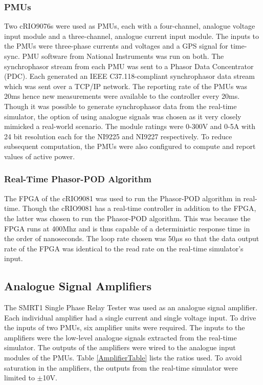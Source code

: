\documentclass[conference]{IEEEtran}
\begin{document}
\subsubsection*{PMUs} Two cRIO9076s were used as PMUs, each with a four-channel, analogue voltage input module and a three-channel, analogue current input module. The inputs to the PMUs were three-phase currents and voltages and a GPS signal for time-sync. PMU software from National Instruments was run on both. The synchrophasor stream from each PMU was sent to a Phasor Data Concentrator (PDC)\cite{SEL}. Each generated an IEEE C37.118-compliant synchrophasor data stream which was sent over a TCP/IP network. The reporting rate of the PMUs was 20ms hence new measurements were available to the controller every 20ms. Though it was possible to generate synchrophasor data from the real-time simulator, the option of using analogue signals was chosen as it very closely mimicked a real-world scenario. The module ratings were 0-300V and 0-5A with 24 bit resolution each\cite{cRIO9081} for the NI9225 and NI9227 respectively. To reduce subsequent computation, the PMUs were also configured to compute and report values of active power.

\subsubsection*{Real-Time Phasor-POD Algorithm} The FPGA of the cRIO9081 was used to run the Phasor-POD algorithm in real-time. Though the cRIO9081 has a real-time controller in addition to the FPGA, the latter was chosen to run the Phasor-POD algorithm. This was because the FPGA runs at 400Mhz and is thus capable of a deterministic response time in the order of nanoseconds. The loop rate chosen was 50$\mu$s so that the data output rate of the FPGA was identical to the read rate on the real-time simulator's input.

\subsection{Analogue Signal Amplifiers}
The SMRT1 Single Phase Relay Tester \cite{Megger} was used as an analogue signal amplifier. Each individual amplifier had a single current and single voltage input. To drive the inputs of two PMUs, six amplifier units were required. The inputs to the amplifiers were the low-level analogue signals extracted from the real-time simulator. The outputs of the amplifiers were wired to the analogue input modules of the PMUs. Table \ref{AmplifierTable} lists the ratios used. To avoid saturation in the amplifiers, the outputs from the real-time simulator were limited to $\pm$10V. 
\end{document}
